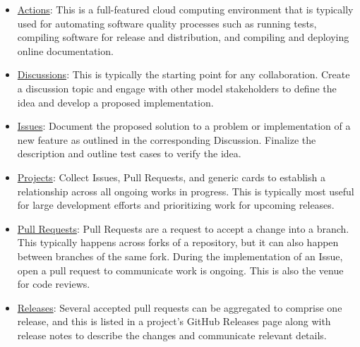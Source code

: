 \documentclass[]{nrel}
\begin{document}
\begin{itemize}
\item \href{https://github.com/features/actions}{Actions}: This is a full-featured cloud computing
environment that is typically used for automating software quality processes such as
running tests, compiling software for release and distribution, and compiling and deploying
online documentation.

\item \href{https://docs.github.com/en/discussions}{Discussions}: This is typically the starting point
for any collaboration. Create a discussion topic and engage with other model stakeholders
to define the idea and develop a proposed implementation.

\item \href{https://docs.github.com/en/issues/tracking-your-work-with-issues/about-issues}{Issues}:
Document the proposed solution to a problem or implementation of a new feature as outlined
in the corresponding Discussion. Finalize the description and outline test cases to verify
the idea.

\item \href{https://docs.github.com/en/issues/planning-and-tracking-with-projects/learning-about-projects/about-projects}{Projects}:
Collect Issues, Pull Requests, and generic cards to establish a relationship across all
ongoing works in progress. This is typically most useful for large development efforts
and prioritizing work for upcoming releases.

\item \href{https://docs.github.com/en/pull-requests/collaborating-with-pull-requests/proposing-changes-to-your-work-with-pull-requests/about-pull-requests}{Pull Requests}:
Pull Requests are a request to accept a change into a branch. This typically happens
across forks of a repository, but it can also happen between branches of the same fork.
During the implementation of an Issue, open a pull request to communicate work is
ongoing. This is also the venue for code reviews.

\item \href{https://docs.github.com/en/repositories/releasing-projects-on-github/about-releases}{Releases}:
Several accepted pull requests can be aggregated to comprise one release, and this is
listed in a project’s GitHub Releases page along with release notes to describe the changes
and communicate relevant details.

\end{itemize}
\end{document}
